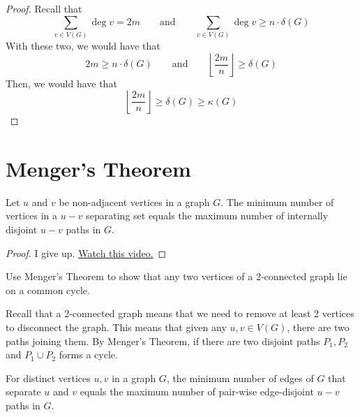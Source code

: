 \begin{proof}
  Recall that
  \[
    \sum_{v \in V(G)} \deg v = 2m \qquad \text{and} 
    \qquad \sum_{v \in V(G)} \deg v \geq n \cdot \delta(G) 
  \]
  With these two, we would have that 
  \[
    2m \geq n \cdot \delta(G) \qquad \text{and}
    \qquad \left\lfloor \frac{2m}{n} \right\rfloor \geq \delta(G) 
  \]
  Then, we would have that 
  \[
    \left\lfloor \frac{2m}{n} \right\rfloor \geq \delta(G) \geq
    \kappa(G) 
  \]
\end{proof}

\section{Menger's Theorem}

\begin{theorem}[Menger, 1927]
  Let \(u\) and \(v\) be non-adjacent vertices in a graph \(G\).
  The minimum number of vertices in a \(u-v\) separating set
  equals the maximum number of internally disjoint \(u-v\) paths
  in \(G\).
\end{theorem}

\begin{proof}
  I give up.
  \href{https://youtu.be/2rbbq-Mk-YE?si=C78wD7AtOfpNnipF}{Watch
  this video.}
\end{proof}

\begin{nexample}
  Use Menger's Theorem to show that any two vertices of a
  2-connected graph lie on a common cycle.

  Recall that a 2-connected graph means that we need to remove at
  least 2 vertices to disconnect the graph. This means that given
  any \(u, v \in V(G)\), there are two paths joining them. By
  Menger's Theorem, if there are two disjoint paths \(P_1, P_2\)
  and \(P_1 \cup P_2\) forms a cycle.
\end{nexample}

\begin{theorem}
  For distinct vertices \(u, v\) in a graph \(G\), the minimum
  number of edges of \(G\) that separate \(u\) and \(v\) equals
  the maximum number of pair-wise edge-disjoint \(u-v\) paths in
  \(G\).
\end{theorem}

